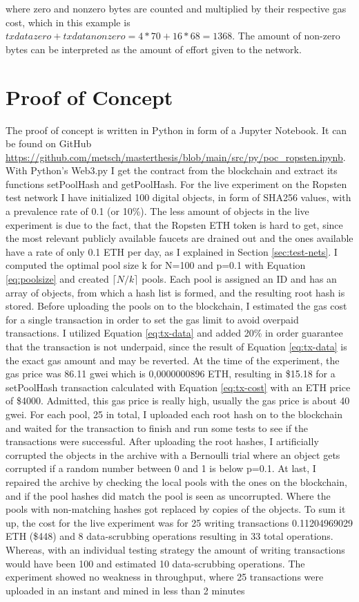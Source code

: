 where zero and nonzero bytes are counted and multiplied by their respective gas cost, which in this example is $txdatazero+txdatanonzero = 4 * 70 + 16 * 68 = 1368 $. The amount of non-zero bytes can be interpreted as the amount of effort given to the network.

\section{Proof of Concept}\label{sec:poc}
The proof of concept is written in Python in form of a Jupyter Notebook. It can be found on GitHub \url{https://github.com/metsch/masterthesis/blob/main/src/py/poc_ropsten.ipynb}. With Python's Web3.py I get the contract from the blockchain and extract its functions setPoolHash and getPoolHash. For the live experiment on the Ropsten test network I have initialized 100 digital objects, in form of SHA256 values, with a prevalence rate of 0.1 (or 10\%). The less amount of objects in the live experiment is due to the fact, that the Ropsten ETH token is hard to get, since the most relevant publicly available faucets are drained out and the ones available have a rate of only 0.1 ETH per day, as I explained in Section \ref{sec:test-nets}. I computed the optimal pool size k for N=100 and p=0.1 with Equation \ref{eq:poolsize} and created $\lceil N/k \rceil$ pools. Each pool is assigned an ID and has an array of objects, from which a hash list is formed, and the resulting root hash is stored. 
Before uploading the pools on to the blockchain, I estimated the gas cost for a single transaction in order to set the gas limit to avoid overpaid transactions. I utilized Equation \ref{eq:tx-data} and added 20\% in order guarantee that the transaction is not underpaid, since the result of Equation \ref{eq:tx-data} is the exact gas amount and may be reverted.
At the time of the experiment, the gas price was 86.11 gwei which is 0,0000000896 ETH, resulting in \$15.18 for a setPoolHash transaction calculated with Equation \ref{eq:tx-cost} with an ETH price of \$4000. Admitted, this gas price is really high, usually the gas price is about 40 gwei. 
For each pool, 25 in total, I uploaded each root hash on to the blockchain and waited for the transaction to finish and run some tests to see if the transactions were successful.
After uploading the root hashes, I artificially corrupted the objects in the archive with a Bernoulli trial where an object gets corrupted if a random number between 0 and 1 is below p=0.1. At last, I repaired the archive by checking the local pools with the ones on the blockchain, and if the pool hashes did match the pool is seen as uncorrupted. Where the pools with non-matching hashes got replaced by copies of the objects.
To sum it up, the cost for the live experiment was for 25 writing transactions 0.11204969029 ETH (\$448) and 8 data-scrubbing operations resulting in 33 total operations. Whereas, with an individual testing strategy the amount of writing transactions would have been 100 and estimated 10 data-scrubbing operations. The experiment showed no weakness in throughput, where 25 transactions were uploaded in an instant and mined in less than 2 minutes

